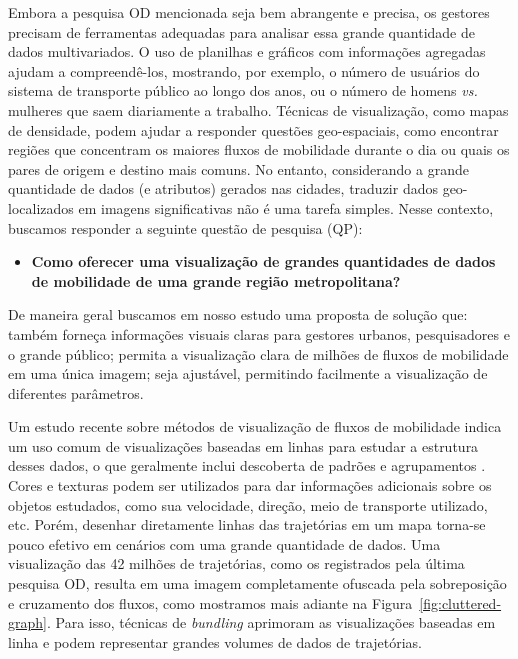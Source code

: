 Embora a pesquisa OD mencionada seja bem abrangente e precisa, 
os gestores precisam de ferramentas adequadas para analisar essa grande quantidade de
dados multivariados. O uso de planilhas e gráficos com informações agregadas
ajudam a compreendê-los, mostrando, por exemplo, o número de usuários 
do sistema de transporte público ao longo dos anos, ou o número de homens \emph{vs.} mulheres
que saem diariamente a trabalho. Técnicas de visualização, como mapas de densidade,
podem ajudar a responder questões geo-espaciais, como encontrar regiões que concentram
os maiores fluxos de mobilidade durante o dia ou quais os pares de origem e destino
mais comuns. No entanto, considerando a grande quantidade de dados (e atributos) gerados
nas cidades, traduzir dados geo-localizados em imagens significativas não é uma tarefa simples.
Nesse contexto, buscamos responder a seguinte questão de pesquisa (QP):

\begin{itemize}
  \item \textbf{Como oferecer uma visualização de grandes quantidades de
dados de mobilidade de uma grande região metropolitana?}
\end{itemize}

De maneira geral buscamos em nosso estudo uma proposta de solução que: também
forneça informações visuais claras para gestores urbanos, pesquisadores e o
grande público; permita a visualização clara de milhões de fluxos de mobilidade
em uma única imagem; seja ajustável, permitindo facilmente a visualização de
diferentes parâmetros.

Um estudo recente sobre métodos de visualização de fluxos de mobilidade indica
um uso comum de visualizações baseadas em linhas para estudar a estrutura desses
dados, o que geralmente inclui descoberta de padrões e agrupamentos
\citep{Chen2015}. Cores e texturas podem ser utilizados para dar informações
adicionais sobre os objetos estudados, como sua velocidade, direção, meio de
transporte utilizado, etc. Porém, desenhar diretamente linhas das trajetórias em
um mapa torna-se pouco efetivo em cenários com uma grande quantidade de dados.
Uma visualização das 42 milhões de trajetórias, como os registrados pela última
pesquisa OD, resulta em uma imagem completamente ofuscada pela sobreposição e
cruzamento dos fluxos, como mostramos mais adiante na
Figura~\ref{fig:cluttered-graph}. Para isso, técnicas de \emph{bundling}
aprimoram as visualizações baseadas em linha e podem representar grandes volumes
de dados de trajetórias.

